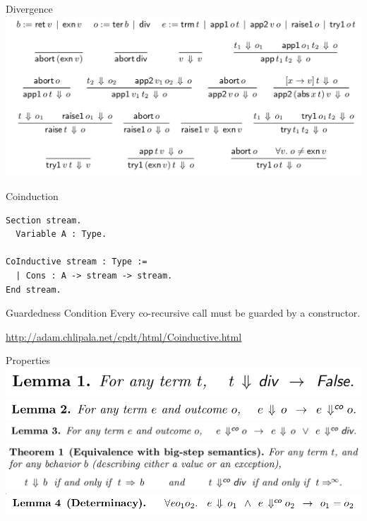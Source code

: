 \documentclass[page number,dvipsnames]{beamer}
\begin{document}
\begin{frame}{Divergence}
  \center
  \includegraphics[scale=0.3]{div_rules.png}
\end{frame}

\begin{frame}[fragile]{Coinduction}
  \begin{lstlisting}[language=Coq]
Section stream.
  Variable A : Type.

CoInductive stream : Type :=
  | Cons : A -> stream -> stream.
End stream.
  \end{lstlisting}
  \vfill
  \begin{alertblock}{Guardedness Condition}
    Every co-recursive call must be guarded by a constructor.
  \end{alertblock}
  \vfill
  \url{http://adam.chlipala.net/cpdt/html/Coinductive.html}
\end{frame}

\begin{frame}{Properties}
  \center
  \includegraphics[scale=0.3]{lemma1.png}
  \vfill
  \includegraphics[scale=0.3]{lemma2.png}
  \vfill
  \includegraphics[scale=0.3]{lemma3.png}
  \vfill
  \includegraphics[scale=0.3]{thm1.png}
  \vfill
  \includegraphics[scale=0.3]{lemma4.png}
\end{frame}
\end{document}
